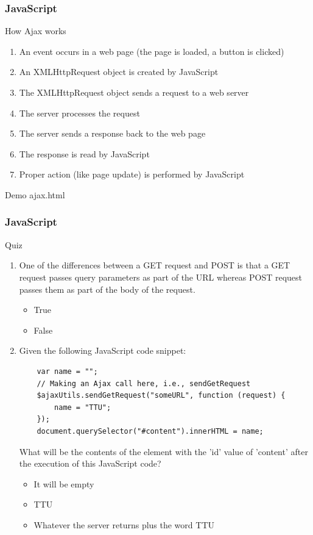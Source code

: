 \documentclass[xcolor=dvipsnames,10pt]{beamer}
\begin{document}
\begin{frame}[fragile]
\frametitle{JavaScript}
\begin{block}{How Ajax works}
\begin{enumerate}
	\item An event occurs in a web page (the page is loaded, a button is clicked)
	\item An XMLHttpRequest object is created by JavaScript
	\item The XMLHttpRequest object sends a request to a web server
	\item The server processes the request
	\item The server sends a response back to the web page
	\item The response is read by JavaScript
	\item Proper action (like page update) is performed by JavaScript
\end{enumerate}	
\end{block}
\begin{block}{Demo}
	ajax.html
\end{block}
\end{frame}
\begin{frame}[fragile]
\frametitle{JavaScript}
\begin{block}{Quiz}
\begin{enumerate}
	\item One of the differences between a GET request and POST is that a GET request passes query parameters as part of the URL whereas POST request passes them as part of the body of the request.
	\begin{itemize}
		\item True
		\item False
	\end{itemize}
	\item Given the following JavaScript code snippet:
	\small
	{\color{blue}
	\begin{verbatim}
	var name = "";
	// Making an Ajax call here, i.e., sendGetRequest
	$ajaxUtils.sendGetRequest("someURL", function (request) {
	    name = "TTU";
	});	
	document.querySelector("#content").innerHTML = name;
	\end{verbatim}}
	\normalsize
	What will be the contents of the element with the 'id' value of 'content' after the execution of this JavaScript code?
	\begin{itemize}
		\item It will be empty
		\item TTU
		\item Whatever the server returns plus the word TTU
	\end{itemize}
\end{enumerate}
\end{block}
\end{frame}
\end{document}
